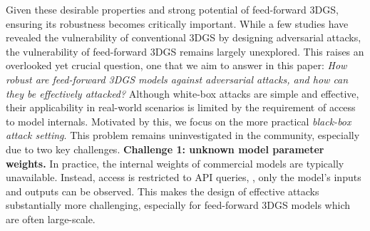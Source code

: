 \documentclass[runningheads]{llncs}
\begin{document}
Given these desirable properties and strong potential of feed-forward 3DGS, ensuring its robustness becomes critically important. While a few studies\cite{lu2024poison,zeybey2024gaussian} have revealed the vulnerability of conventional 3DGS by designing adversarial attacks, the vulnerability of feed-forward 3DGS remains largely unexplored. This raises an overlooked yet crucial question, one that we aim to answer in this paper: \textit{How robust are feed-forward 3DGS models against adversarial attacks, and how can they be effectively attacked?} Although white-box attacks are simple and effective, their applicability in real-world scenarios is limited by the requirement of access to model internals. Motivated by this, we focus on the more practical \textit{black-box attack setting}.  This problem remains uninvestigated in the community, especially due to two key challenges. 
\textbf{Challenge 1: unknown model parameter weights.} In practice, the internal weights of commercial models are typically unavailable. Instead, access is restricted to API queries, \ie, only the model’s inputs and outputs can be observed. This makes the design of effective attacks substantially more challenging, especially for feed-forward 3DGS models which are often large-scale.
\end{document}
